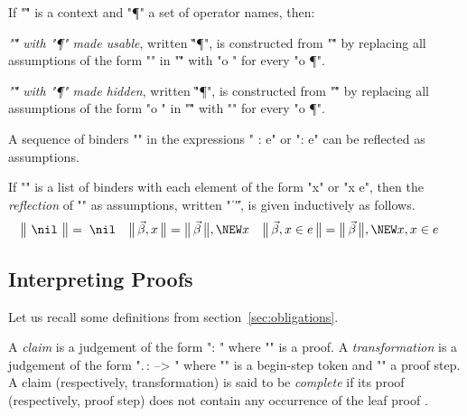 \documentclass[a4paper]{easychair}
\begin{document}
\pagebreak[2]

\begin{defn} \label{defn:use/hide}
If "\G" is a context and "\P" a set of operator names, then:
  \begin{ecom}
  \item \emph{"\G" with "\P" made usable}, written "\G \USING \P", is
    constructed from "\G" by replacing all assumptions of the form
    "" in "\G" with "o \DEF \delta" for every "o
    \in \P".
  \item \emph{"\G" with "\P" made hidden}, written "\G \HIDING \P", is
    constructed from "\G" by replacing all assumptions of the form "o
    \DEF \delta" in "\G" with "" for every "o \in
    \P".
  \end{ecom}
\end{defn}

\def\refl#1{\bigl\|\,#1\,\bigr\|}

\noindent A sequence of binders "\vec \beta" in the \tlatwo expressions "\forall
\vec \beta : e" or "\exists \vec \beta : e" can be reflected as
assumptions.

\begin{defn} \label{defn:binding-reflection}
If "\vec \beta" is a list of binders with each element of the form
  "x" or "x \in e", then the \emph{reflection} of "\vec \beta" as
  assumptions, written "\refl{\vec \beta}", is given inductively as
  follows.
  \begin{align*}
    \refl{\,\nil\,} &= \;\nil &
    \refl{\vec \beta, x} &= \refl{\vec \beta}, \NEW x &
    \refl{\vec \beta, x \in e} &= \refl{\vec \beta}, \NEW x, x \in e
  \end{align*}
\end{defn}

\subsection{Interpreting Proofs}
\label{apx:proof-transformation}

Let us recall some definitions from section~\ref{sec:obligations}.

\begin{defn} \label{defn:check/trans-def}
A \emph{claim} is a judgement of the form "\pi : "
  where "\pi" is a \tlatwo proof. A \emph{transformation} is a
  judgement of the form "\sigma.\,\tau :  --> " where "\sigma" is a begin-step token and "\tau" a proof
  step. A claim (respectively, transformation) is said to be
  \emph{complete} if its proof (respectively, proof step) does not
  contain any occurrence of the leaf proof \OMITTED.
\end{defn}
\end{document}
